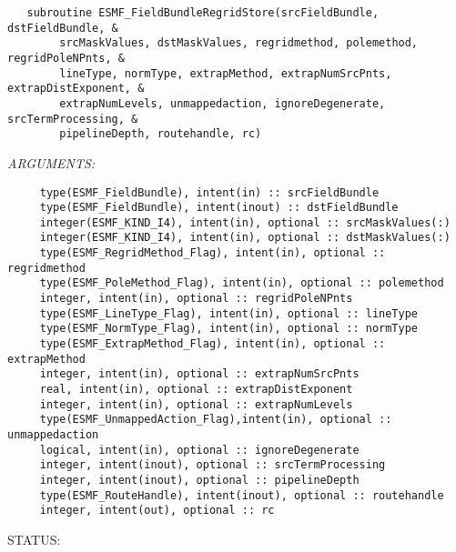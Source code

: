    \label{api:esmf_fieldbundleregridstore}
\begin{verbatim}   subroutine ESMF_FieldBundleRegridStore(srcFieldBundle, dstFieldBundle, &
        srcMaskValues, dstMaskValues, regridmethod, polemethod, regridPoleNPnts, &
        lineType, normType, extrapMethod, extrapNumSrcPnts, extrapDistExponent, &
        extrapNumLevels, unmappedaction, ignoreDegenerate, srcTermProcessing, &
        pipelineDepth, routehandle, rc)\end{verbatim}{\em ARGUMENTS:}
\begin{verbatim}     type(ESMF_FieldBundle), intent(in) :: srcFieldBundle
     type(ESMF_FieldBundle), intent(inout) :: dstFieldBundle
     integer(ESMF_KIND_I4), intent(in), optional :: srcMaskValues(:)
     integer(ESMF_KIND_I4), intent(in), optional :: dstMaskValues(:)
     type(ESMF_RegridMethod_Flag), intent(in), optional :: regridmethod
     type(ESMF_PoleMethod_Flag), intent(in), optional :: polemethod
     integer, intent(in), optional :: regridPoleNPnts
     type(ESMF_LineType_Flag), intent(in), optional :: lineType
     type(ESMF_NormType_Flag), intent(in), optional :: normType
     type(ESMF_ExtrapMethod_Flag), intent(in), optional :: extrapMethod
     integer, intent(in), optional :: extrapNumSrcPnts
     real, intent(in), optional :: extrapDistExponent
     integer, intent(in), optional :: extrapNumLevels
     type(ESMF_UnmappedAction_Flag),intent(in), optional :: unmappedaction
     logical, intent(in), optional :: ignoreDegenerate
     integer, intent(inout), optional :: srcTermProcessing
     integer, intent(inout), optional :: pipelineDepth
     type(ESMF_RouteHandle), intent(inout), optional :: routehandle
     integer, intent(out), optional :: rc\end{verbatim}
{\sf STATUS:}
